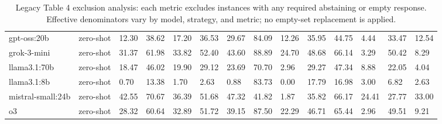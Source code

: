 \begin{table}[!t]
\begin{tabular}{llllllllllllll}
gpt-oss:20b & zero-shot & 12.30 & 38.62 & 17.20 & 36.53 & 29.67 & 84.09 & 12.26 & 35.95 & 44.75 & 4.44 & 33.47 & 12.54 \\
grok-3-mini & zero-shot & 31.37 & 61.98 & 33.82 & 52.40 & 43.60 & 88.89 & 24.70 & 48.68 & 66.14 & 3.29 & 50.42 & 8.29 \\
llama3.1:70b & zero-shot & 18.47 & 46.02 & 19.90 & 29.12 & 23.69 & 70.70 & 2.96 & 29.27 & 47.34 & 8.88 & 22.05 & 4.04 \\
llama3.1:8b & zero-shot & 0.70 & 13.38 & 1.70 & 2.63 & 0.88 & 83.73 & 0.00 & 17.79 & 16.98 & 3.00 & 6.82 & 2.63 \\
mistral-small:24b & zero-shot & 42.55 & 70.67 & 36.39 & 51.68 & 47.32 & 41.82 & 1.87 & 35.82 & 66.17 & 24.41 & 27.77 & 33.00 \\
o3 & zero-shot & 28.32 & 60.64 & 32.89 & 51.72 & 39.15 & 87.50 & 22.29 & 46.71 & 65.44 & 2.96 & 49.51 & 9.21 \\
\bottomrule
\end{tabular}
\caption{Legacy Table 4 exclusion analysis: each metric excludes instances with any required abstaining or empty response. Effective denominators vary by model, strategy, and metric; no empty-set replacement is applied.}
\label{tab:consistency_per_action_filtering_exclusion}
\end{table}
